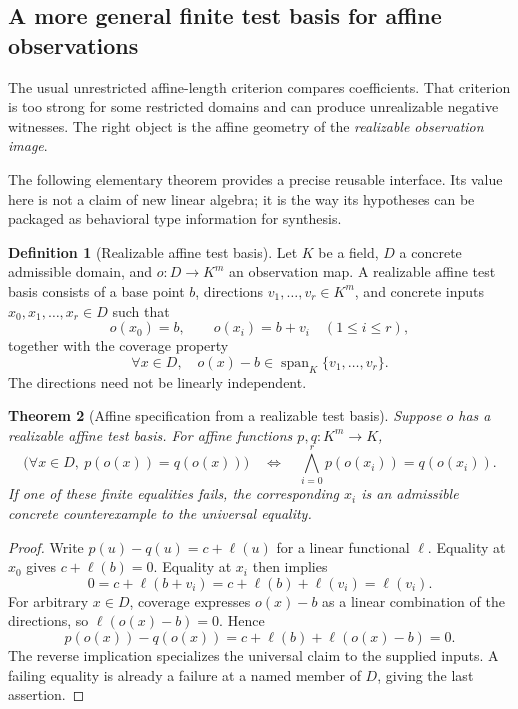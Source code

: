 \documentclass[11pt,a4paper]{article}
\newtheorem{theorem}{Theorem}[section]
\theoremstyle{definition}
\newtheorem{definition}[theorem]{Definition}
\theoremstyle{remark}
\begin{document}
\subsection{A more general finite test basis for affine observations}

The usual unrestricted affine-length criterion compares coefficients. That
criterion is too strong for some restricted domains and can produce unrealizable
negative witnesses. The right object is the affine geometry of the
\emph{realizable observation image}.

The following elementary theorem provides a precise reusable interface. Its
value here is not a claim of new linear algebra; it is the way its hypotheses
can be packaged as behavioral type information for synthesis.

\begin{definition}[Realizable affine test basis]
Let $K$ be a field, $D$ a concrete admissible domain, and $o:D\to K^m$ an
observation map. A realizable affine test basis consists of a base point $b$,
directions $v_1,\ldots,v_r\in K^m$, and concrete inputs
$x_0,x_1,\ldots,x_r\in D$ such that
\[
 o(x_0)=b,\qquad o(x_i)=b+v_i\quad(1\le i\le r),
\]
together with the coverage property
\[
 \forall x\in D,\quad
 o(x)-b\in\operatorname{span}_K\{v_1,\ldots,v_r\}.
\]
The directions need not be linearly independent.
\end{definition}

\begin{theorem}[Affine specification from a realizable test basis]\label{thm:basis}
Suppose $o$ has a realizable affine test basis. For affine functions
$p,q:K^m\to K$,
\[
 \bigl(\forall x\in D,\ p(o(x))=q(o(x))\bigr)
 \quad\Longleftrightarrow\quad
 \bigwedge_{i=0}^{r} p(o(x_i))=q(o(x_i)).
\]
If one of these finite equalities fails, the corresponding $x_i$ is an
admissible concrete counterexample to the universal equality.
\end{theorem}

\begin{proof}
Write $p(u)-q(u)=c+\ell(u)$ for a linear functional $\ell$. Equality at $x_0$
gives $c+\ell(b)=0$. Equality at $x_i$ then implies
\[
 0=c+\ell(b+v_i)=c+\ell(b)+\ell(v_i)=\ell(v_i).
\]
For arbitrary $x\in D$, coverage expresses $o(x)-b$ as a linear combination
of the directions, so $\ell(o(x)-b)=0$. Hence
\[
 p(o(x))-q(o(x))=c+\ell(b)+\ell(o(x)-b)=0.
\]
The reverse implication specializes the universal claim to the supplied inputs.
A failing equality is already a failure at a named member of $D$, giving the
last assertion.
\end{proof}
\end{document}
